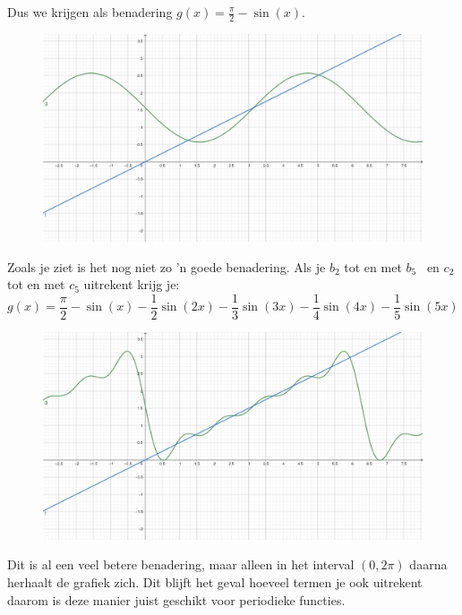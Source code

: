\documentclass[../../main.tex]{subfiles}
\begin{document}
Dus we krijgen als benadering $g(x)=\frac{\pi}{2}-\sin(x)$.
\begin{figure}[h]
    \centering
    \includegraphics[width=\textwidth]{./img/fourier_1.png}
\end{figure}

Zoals je ziet is het nog niet zo 'n goede benadering. Als je $b_2$ tot en met $b_5$ \ en $c_2$ tot en met $c_5$ uitrekent krijg je:
$$g(x)=\frac{\pi}{2}-\sin(x)-\frac{1}{2}\sin(2x)-\frac{1}{3}\sin(3x)-\frac{1}{4}\sin(4x)-\frac{1}{5}\sin(5x)$$
\begin{figure}[h]
    \centering
    \includegraphics[width=\textwidth]{./img/fourier_2.png}
\end{figure}

Dit is al een veel betere benadering, maar alleen in het interval $(0,2\pi)$ daarna herhaalt de grafiek zich. Dit blijft het geval hoeveel termen je ook uitrekent daarom is deze manier juist geschikt voor periodieke functies.
\end{document}
